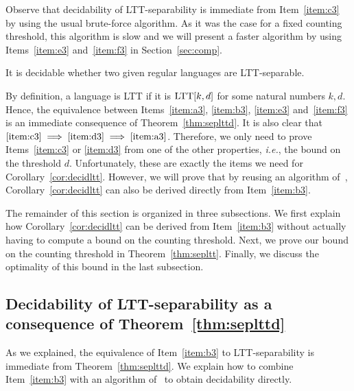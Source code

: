\documentclass{LMCS}
\newcommand{\ltt}{\textup{LTT}\xspace}
\theoremstyle{plain}
\begin{document}
Observe that decidability of \ltt-separability is immediate from
Item~\eqref{item:c3} by using the usual brute-force algorithm. As it was
the case for a fixed counting threshold, this algorithm is
slow and we will present a faster algorithm by using
Items~\eqref{item:e3} and~\eqref{item:f3} in Section~\ref{sec:comp}.

\begin{cor}
  \label{cor:decidltt}
  It is decidable whether two given regular languages are
  \ltt-separable.
\end{cor}

By definition, a language is \ltt if it is $\ltt[k,d]$ for
some natural numbers $k,d$. Hence, the equivalence between
Items~\eqref{item:a3}, \eqref{item:b3}, \eqref{item:e3} and~\eqref{item:f3} is 
an immediate consequence of Theorem~\ref{thm:seplttd}. It is also
clear that
$\eqref{item:c3} \implies\eqref{item:d3}\implies\eqref{item:a3}$.
Therefore, we
only need to prove Items~\eqref{item:c3} or \eqref{item:d3} from one
of the other properties, \emph{i.e.}, the
bound on the threshold $d$. Unfortunately, these are exactly the items
we need for Corollary~\ref{cor:decidltt}. However, we will prove that
by reusing an algorithm of~\cite{bojLTT}, Corollary~\ref{cor:decidltt}
can also be derived directly from Item~\eqref{item:b3}.

The remainder of this section is organized in three
subsections. We first explain how Corollary~\ref{cor:decidltt} can be
derived from Item~\eqref{item:b3} without actually having to compute a
bound on the counting threshold. Next, we prove
our bound on the counting threshold in Theorem~\ref{thm:sepltt}. Finally,
we discuss the optimality of this bound in the last subsection.



\subsection{Decidability of \ltt-separability as a consequence of
  Theorem~\ref{thm:seplttd}}

As we explained, the equivalence of Item~\eqref{item:b3} to
\ltt-separability is immediate from Theorem~\ref{thm:seplttd}. 
We explain how to combine Item~\eqref{item:b3} with an algorithm
of~\cite{bojLTT} to obtain decidability directly.
\end{document}
